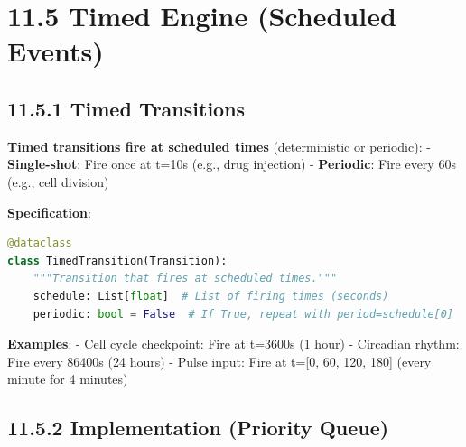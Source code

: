 \hypertarget{timed-engine-scheduled-events}{%
\section{11.5 Timed Engine (Scheduled
Events)}\label{timed-engine-scheduled-events}}

\hypertarget{timed-transitions}{%
\subsection{11.5.1 Timed Transitions}\label{timed-transitions}}

\textbf{Timed transitions fire at scheduled times} (deterministic or
periodic): - \textbf{Single-shot}: Fire once at t=10s (e.g., drug
injection) - \textbf{Periodic}: Fire every 60s (e.g., cell division)

\textbf{Specification}:

\begin{lstlisting}[language=Python]
@dataclass
class TimedTransition(Transition):
    """Transition that fires at scheduled times."""
    schedule: List[float]  # List of firing times (seconds)
    periodic: bool = False  # If True, repeat with period=schedule[0]
\end{lstlisting}

\textbf{Examples}: - Cell cycle checkpoint: Fire at t=3600s (1 hour) -
Circadian rhythm: Fire every 86400s (24 hours) - Pulse input: Fire at
t={[}0, 60, 120, 180{]} (every minute for 4 minutes)

\hypertarget{implementation-priority-queue}{%
\subsection{11.5.2 Implementation (Priority
Queue)}\label{implementation-priority-queue}}

